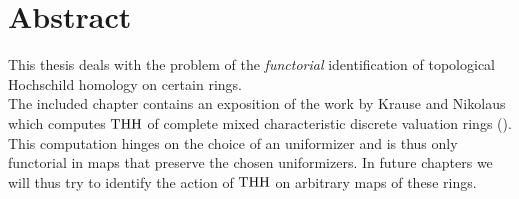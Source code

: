 \chapter*{Abstract}
This thesis deals with the problem of the \textit{functorial} identification of topological Hochschild homology on certain rings. \\
The included chapter contains an exposition of the work by Krause and Nikolaus which computes $\operatorname{THH}$ of complete mixed characteristic discrete valuation rings (\cite{KNBokstedt}). This computation hinges on the choice of an uniformizer and is thus only functorial in maps that preserve the chosen uniformizers.
In future chapters we will thus try to identify the action of $\operatorname{THH}$ on arbitrary maps of these rings. 


